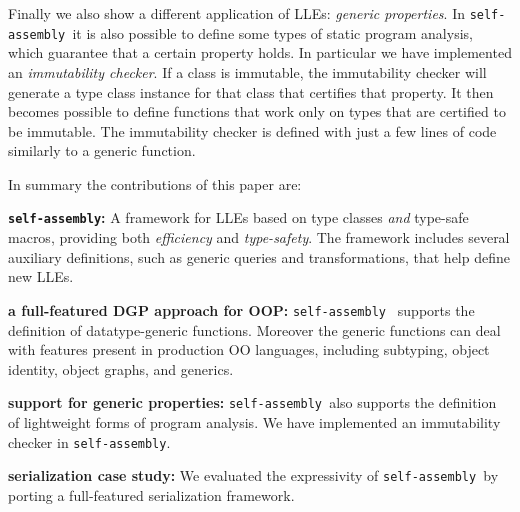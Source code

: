 \documentclass[preprint,nocopyrightspace]{sigplanconf}
\newcommand{\selfassembly}{\texttt{self-assembly~}}
\newcommand{\sselfassembly}{\texttt{self-assembly}}
\begin{document}
Finally we also show a different application of LLEs: \emph{generic
  properties}. In \selfassembly it is also possible to define some
types of static program analysis, which guarantee that a certain
property holds. In particular we have implemented an
\emph{immutability checker}. If a class is immutable, the immutability
checker will generate a type class instance for that class that
certifies that property. It then becomes possible to
define functions that work only on types that are certified to be
immutable.  The immutability checker is defined with just a few lines
of code similarly to a generic function.

In summary the contributions of this paper are:

\begin{itemize*}

\item {\bf \sselfassembly:} A framework for LLEs based on
  type classes \emph{and} type-safe macros, providing both
  \emph{efficiency} and \emph{type-safety}. The framework includes
  several auxiliary definitions, such as generic queries and
  transformations, that help define new LLEs.

\item {\bf a full-featured DGP approach for OOP:} \selfassembly
  supports the definition of datatype-generic functions.
  Moreover the generic functions can deal with features present in
  production OO languages, including subtyping, object identity,
  object graphs, and generics.

\item {\bf support for generic properties:} \selfassembly also
  supports the definition of lightweight forms of program analysis.
  We have implemented an immutability checker in \sselfassembly.

\item {\bf serialization case study:} We evaluated the
  expressivity of \selfassembly by porting a full-featured
  serialization \mbox{framework}.




\end{itemize*}
\end{document}
